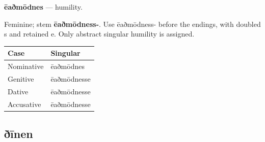 \par\begin{minipage}{\linewidth}\raggedright
\textbf{ēaðmōdnes} — humility.

Feminine; stem \textbf{ēaðmōdness-}. Use ēaðmōdness- before the endings, with doubled s and retained e. Only abstract singular humility is assigned.

\par\begingroup
\fontsize{10.5}{13.2}\selectfont
\setlength{\LTleft}{0pt}\setlength{\LTright}{\fill}
\noindent
\begin{tabular}{@{}>{\raggedright\arraybackslash}p{57.71mm}>{\raggedright\arraybackslash}p{63.48mm}@{}}
\toprule
\textbf{Case} & \textbf{Singular} \\
\midrule
Nominative & ēaðmōdnes \\
Genitive & ēaðmōdnesse \\
Dative & ēaðmōdnesse \\
Accusative & ēaðmōdnesse \\
\bottomrule
\end{tabular}
\par\endgroup

\end{minipage}\par
{}
\subsection*{ðīnen}


